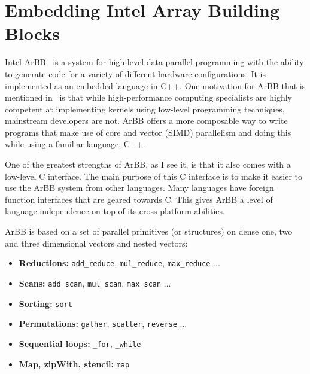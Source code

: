 \documentclass[a4paper]{book}
\begin{document}




\FloatBarrier 
%
%
\section{Embedding Intel Array Building Blocks} 

Intel ArBB~\citet{ARBB2011} is a system for high-level data-parallel programming with the 
ability to generate code for a variety of different hardware configurations. It is implemented 
as an embedded language in C++. One motivation for ArBB that is mentioned in~\citet{ARBB2011} is 
that while high-performance computing specialists are highly competent at implementing 
kernels using low-level programming techniques, mainstream developers are not. ArBB offers 
a more composable way to write programs that make use of core and vector (SIMD) parallelism and 
doing this while using a familiar language, C++.  

One of the greatest strengths of ArBB, as I see it, is that it also comes with a low-level C 
interface. The main purpose of this C interface is to make it easier to use the ArBB system 
from other languages. Many languages have foreign function interfaces that are geared towards C.
This gives ArBB a level of language independence on top of its cross platform abilities.  


ArBB is based on a set of parallel primitives (or structures) on dense one, two and three dimensional vectors and nested vectors: 
\begin{itemize} 
\item {\bf Reductions:}   {\tt add\_reduce}, {\tt mul\_reduce}, {\tt max\_reduce} ... 
\item {\bf Scans:}        {\tt add\_scan}, {\tt mul\_scan}, {\tt max\_scan} ... 
\item {\bf Sorting:}      {\tt sort} 
\item {\bf Permutations:} {\tt gather}, {\tt scatter}, {\tt reverse} ...
\item {\bf Sequential loops:} {\tt \_for}, {\tt \_while} 
\item {\bf Map, zipWith, stencil:}  {\tt map} 
\end{itemize}
\end{document}

